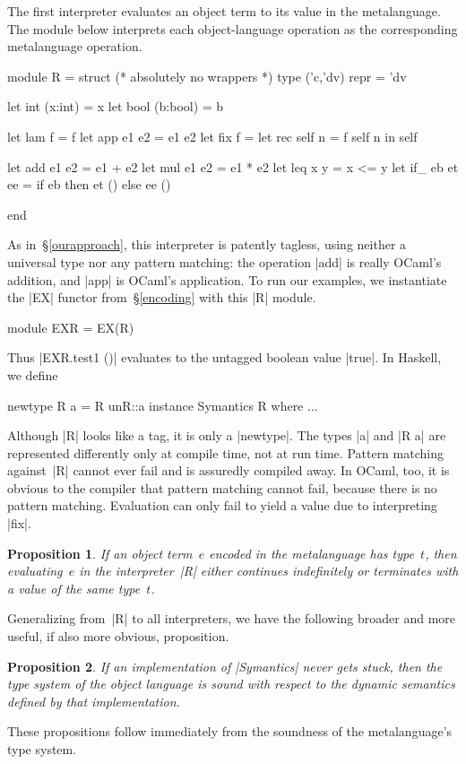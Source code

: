 \documentclass[preprint]{sigplanconf}
\newtheorem{prop}{Proposition}
\begin{document}
The first interpreter evaluates an object term to its value in the
metalanguage.  The module below interprets each object\hyp language
operation as the corresponding metalanguage operation.
\begin{code}
module R = struct
  (* absolutely no wrappers *)
  type ('c,'dv) repr = 'dv

  let int  (x:int)  = x
  let bool (b:bool) = b

  let lam  f        = f
  let app  e1 e2    = e1 e2
  let fix  f        =
    let rec self n = f self n in self

  let add  e1 e2    = e1 + e2
  let mul  e1 e2    = e1 * e2
  let leq  x y      = x <= y
  let if_  eb et ee = if eb then et () else ee ()

end
\end{code}

As in~\S\ref{ourapproach},
this interpreter is patently tagless, using neither a universal type nor
any pattern matching: the operation |add| is really
OCaml's addition, and |app| is OCaml's application. To run our
examples, we instantiate the |EX| functor from~\S\ref{encoding} with this |R|
module.
\begin{code}
module EXR = EX(R)
\end{code}
Thus |EXR.test1 ()| evaluates to the untagged boolean value |true|.
In Haskell, we define
\begin{code}
newtype R a = R {unR::a}
instance Symantics R where ...
\end{code}
Although |R| looks like a tag, it is only
a |newtype|.  The types |a| and |R a| are represented differently
only at compile time, not at run time.  Pattern matching against~|R|
cannot ever fail and is assuredly compiled away.
In OCaml, too, it is obvious to the compiler that
pattern matching cannot fail, because there is no
pattern matching. Evaluation can only fail to yield a value
due to interpreting |fix|.
\begin{prop}
If an object term~$e$ encoded in the metalanguage has type~$t$,
then evaluating~$e$ in the interpreter~|R| either continues
indefinitely or terminates with a value of the same type~$t$.
\end{prop}
Generalizing from~|R| to all interpreters, we have the following
broader and more useful, if also more obvious, proposition.
\begin{prop}
  If an implementation of |Symantics| never gets stuck, then
  the type system of the object
  language is sound with respect to the dynamic semantics defined by
  that implementation.
\end{prop}
These propositions follow immediately from the soundness of the
metalanguage's type system.
\end{document}
